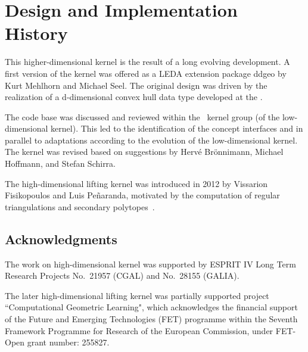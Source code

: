\section{Design and Implementation History}

This higher-dimensional kernel is the result of a long evolving
development. A first version of the kernel was offered as a LEDA
extension package ddgeo by Kurt Mehlhorn and Michael Seel. The
original design was driven by the realization of a d-dimensional
convex hull data type developed at the 
.

The code base was discussed and reviewed within the \cgal\ kernel group
(of the low-dimensional kernel).  This led to the identification of
the concept interfaces and in parallel to adaptations according to the
evolution of the low-dimensional kernel.  The kernel was revised
based on suggestions by Herv\'e Br\"onnimann, Michael Hoffmann, and
Stefan Schirra.

The high-dimensional lifting kernel was introduced in 2012 by Vissarion
Fisikopoulos and Luis Pe\~naranda, motivated by the computation of regular
triangulations and secondary polytopes~\cite{EFKP12}.

\subsection{Acknowledgments}

The work on high-dimensional kernel was supported by ESPRIT IV Long Term
Research Projects No.~21957 (CGAL) and No.~28155 (GALIA).

The later high-dimensional lifting kernel was partially supported project
``Computational Geometric Learning", which acknowledges the financial
support of the Future and Emerging Technologies (FET) programme within the
Seventh Framework Programme for Research of the European Commission, under
FET-Open grant number: 255827.
